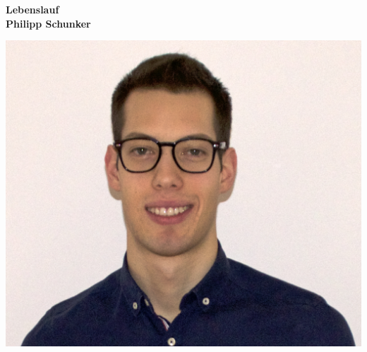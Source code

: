 \begin{minipage}{0.7\textwidth}
\begin{addmargin}[2em]{2em}%
\Large{\textbf{Lebenslauf}}\vspace{0.1cm}\\
\Large{\textbf{Philipp Schunker}}\vspace{1.0cm}\\
\end{addmargin}
\end{minipage}
\begin{minipage}{0.3\textwidth}
	 \includegraphics[width=\textwidth]{images/philipp}
\end{minipage}

